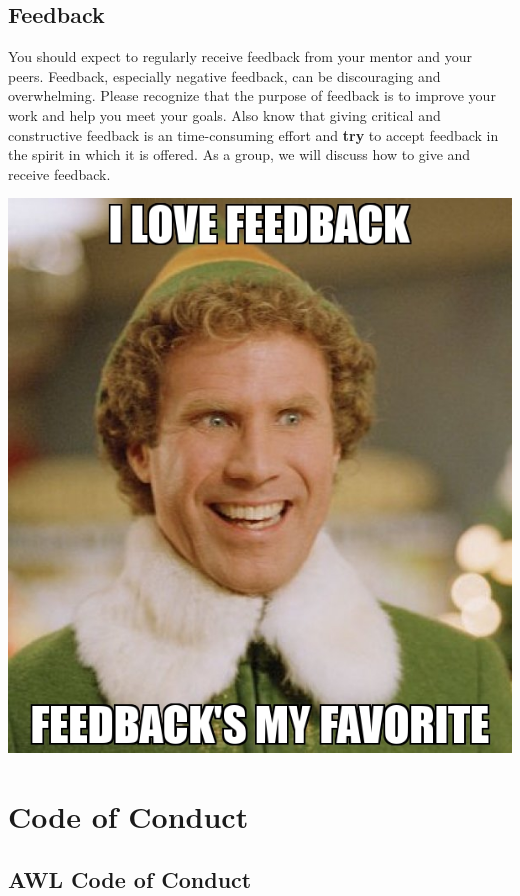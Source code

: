 \documentclass[]{book}
\begin{document}
\hypertarget{feedback}{%
\section{Feedback}\label{feedback}}

You should expect to regularly receive feedback from your mentor and your peers. Feedback, especially negative feedback, can be discouraging and overwhelming. Please recognize that the purpose of feedback is to improve your work and help you meet your goals. Also know that giving critical and constructive feedback is an time-consuming effort and \textbf{try} to accept feedback in the spirit in which it is offered. As a group, we will discuss how to give and receive feedback.

\includegraphics{images/i-love-feedback.jpg}

\hypertarget{code-of-conduct}{%
\chapter{Code of Conduct}\label{code-of-conduct}}

\hypertarget{awl-code-of-conduct}{%
\section{AWL Code of Conduct}\label{awl-code-of-conduct}}
\end{document}
